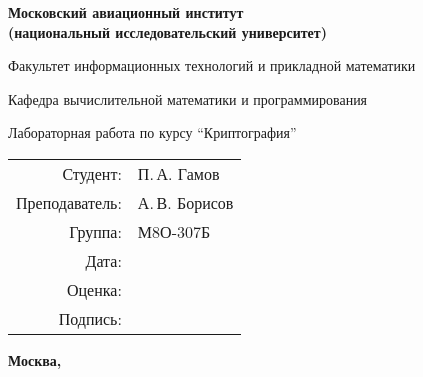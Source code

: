 \begin{titlepage}
\begin{center}
\bfseries
{\Large Московский авиационный институт\\ (национальный исследовательский университет)}

\vspace{48pt}
{\large Факультет информационных технологий и прикладной математики}

\vspace{36pt}
{\large Кафедра вычислительной математики и программирования}

\vspace{48pt}Лабораторная работа  по курсу 
\enquote{Криптография}
\end{center}
\vspace{72pt}

\begin{flushright}
\begin{tabular}{rl}
Студент: & П.\,А. Гамов \\
Преподаватель: & А.\,В. Борисов \\
Группа: & М8О-307Б \\
Дата: & \\
Оценка: & \\
Подпись: & \\
\end{tabular}
\end{flushright}
\vfill
\begin{center}
\bfseries
Москва, \the\year
\end{center}
\end{titlepage}

\pagebreak